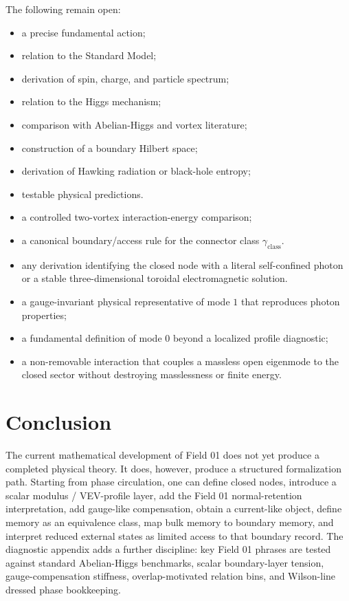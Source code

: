\documentclass[11pt,a4paper]{article}
\begin{document}
The following remain open:
\begin{itemize}
\item a precise fundamental action;
\item relation to the Standard Model;
\item derivation of spin, charge, and particle spectrum;
\item relation to the Higgs mechanism;
\item comparison with Abelian-Higgs and vortex literature;
\item construction of a boundary Hilbert space;
\item derivation of Hawking radiation or black-hole entropy;
\item testable physical predictions.
\item a controlled two-vortex interaction-energy comparison;
\item a canonical boundary/access rule for the connector class $\gamma_{\mathrm{class}}$.
\item any derivation identifying the closed node with a literal self-confined photon or a stable three-dimensional toroidal electromagnetic solution.
\item a gauge-invariant physical representative of mode $1$ that reproduces photon properties;
\item a fundamental definition of mode $0$ beyond a localized profile diagnostic;
\item a non-removable interaction that couples a massless open eigenmode to the closed sector without destroying masslessness or finite energy.
\end{itemize}

\section{Conclusion}

The current mathematical development of Field 01 does not yet produce a completed physical theory. It does, however, produce a structured formalization path. Starting from phase circulation, one can define closed nodes, introduce a scalar modulus / VEV-profile layer, add the Field 01 normal-retention interpretation, add gauge-like compensation, obtain a current-like object, define memory as an equivalence class, map bulk memory to boundary memory, and interpret reduced external states as limited access to that boundary record. The diagnostic appendix adds a further discipline: key Field 01 phrases are tested against standard Abelian-Higgs benchmarks, scalar boundary-layer tension, gauge-compensation stiffness, overlap-motivated relation bins, and Wilson-line dressed phase bookkeeping.
\end{document}

